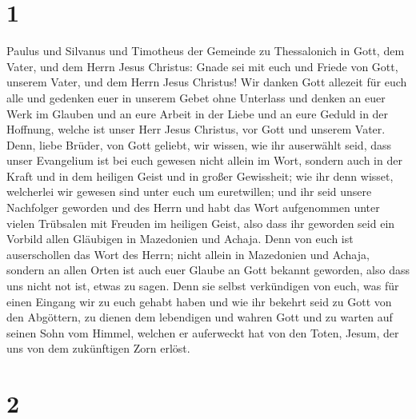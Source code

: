\hypertarget{section}{%
\section{1}\label{section}}

 Paulus und Silvanus und Timotheus der Gemeinde zu
Thessalonich in Gott, dem Vater, und dem Herrn Jesus Christus: Gnade sei
mit euch und Friede von Gott, unserem Vater, und dem Herrn Jesus
Christus!  Wir danken Gott allezeit für euch alle und
gedenken euer in unserem Gebet ohne Unterlass  und denken
an euer Werk im Glauben und an eure Arbeit in der Liebe und an eure
Geduld in der Hoffnung, welche ist unser Herr Jesus Christus, vor Gott
und unserem Vater.  Denn, liebe Brüder, von Gott geliebt,
wir wissen, wie ihr auserwählt seid,  dass unser
Evangelium ist bei euch gewesen nicht allein im Wort, sondern auch in
der Kraft und in dem heiligen Geist und in großer Gewissheit; wie ihr
denn wisset, welcherlei wir gewesen sind unter euch um euretwillen;
 und ihr seid unsere Nachfolger geworden und des Herrn und
habt das Wort aufgenommen unter vielen Trübsalen mit Freuden im heiligen
Geist,  also dass ihr geworden seid ein Vorbild allen
Gläubigen in Mazedonien und Achaja.  Denn von euch ist
auserschollen das Wort des Herrn; nicht allein in Mazedonien und Achaja,
sondern an allen Orten ist auch euer Glaube an Gott bekannt geworden,
also dass uns nicht not ist, etwas zu sagen.  Denn sie
selbst verkündigen von euch, was für einen Eingang wir zu euch gehabt
haben und wie ihr bekehrt seid zu Gott von den Abgöttern, zu dienen dem
lebendigen und wahren Gott  und zu warten auf seinen Sohn
vom Himmel, welchen er auferweckt hat von den Toten, Jesum, der uns von
dem zukünftigen Zorn erlöst.

\hypertarget{section-1}{%
\section{2}\label{section-1}}

